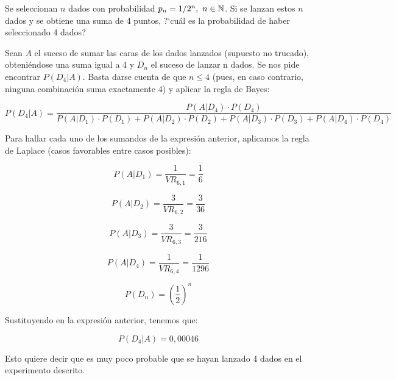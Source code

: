 \problem
Se seleccionan $n$ dados con probabilidad $p_{n} =1/2^{n}, \ n\in \Bbb N$.
Si se lanzan estos $n$
dados y se obtiene una suma de 4 puntos, ?`cu{\'a}l es la probabilidad de  haber  seleccionado
4 dados?

Sean $A$ el suceso de sumar las caras de los dados lanzados (supuesto no trucado), obteniéndose una suma igual a 4 y $D_n$ el suceso de lanzar n dados. Se nos pide encontrar $P(D_4 | A)$. Basta darse cuenta de que $n \leq 4$ (pues, en caso contrario, ninguna combinación suma exactamente 4) y aplicar la regla de Bayes:

$$P(D_4 | A) = \frac{P(A | D_4) · P(D_4)}{P(A | D_1)·P(D_1) + P(A | D_2)·P(D_2) + P(A | D_3)·P(D_3) + P(A | D_4)·P(D_4)}$$

Para hallar cada uno de los sumandos de la expresión anterior, aplicamos la regla de Laplace (casos favorables entre casos posibles):

$$P(A | D_1) = \frac{1}{VR_{6,1}} = \frac{1}{6}$$

$$P(A | D_2) = \frac{3}{VR_{6,2}} = \frac{3}{36}$$

$$P(A | D_3) = \frac{3}{VR_{6,3}} = \frac{3}{216}$$

$$P(A | D_4) = \frac{1}{VR_{6,4}} = \frac{1}{1296}$$

$$P(D_n) = (\frac{1}{2})^n$$

Sustituyendo en la expresión anterior, tenemos que: 

$$P(D_4 | A) = 0,00046$$

Esto quiere decir que es muy poco probable que se hayan lanzado 4 dados en el experimento descrito. 